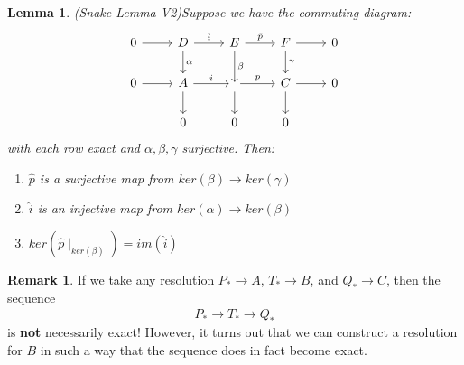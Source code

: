 \documentclass[12pt]{book}
\newtheorem{lemma}[theorem]{Lemma}
\theoremstyle{definition}
\newtheorem{remark}[theorem]{Remark}
\begin{document}
\begin{lemma}(Snake Lemma V2)\label{SnakeLemma}
    Suppose we have the commuting diagram: 
    \[
    \begin{tikzcd}
        0 \arrow[r] & D \arrow[d, "\alpha"] \arrow[r, "\hat{i}"] & E \arrow[r, "\hat{p}"] \arrow[d, "\beta"] & F \arrow[d, "\gamma"] \arrow[r] & 0 \\
        0 \arrow[r] & A \arrow[d] \arrow[r, "i"] & \arrow[d] \arrow[r, "p"] & C \arrow[r] \arrow[d]& 0 \\
        & 0 & 0 & 0 &
    \end{tikzcd}
    \]
    with each row exact and $\alpha, \beta, \gamma$ surjective. Then: 
    \begin{enumerate}
        \item $\hat{p}$ is a surjective map from $ker(\beta) \to ker(\gamma)$
        \item $\hat{i}$ is an injective map from $ker(\alpha) \to ker(\beta)$
        \item $ker(\hat{p} \mid_{ker(\beta)}) = im(\hat{i})$
    \end{enumerate}
\end{lemma}
\begin{remark}
    If we take any resolution $P_* \rightarrow A$, $T_* \rightarrow B$, and $Q_* \rightarrow C$, then the sequence
    \begin{align*}
        P_* \rightarrow T_* \rightarrow Q_*
    \end{align*}    
    is \textbf{not} necessarily exact! However, it turns out that we can construct a resolution for $B$ in such a way that the sequence does in fact become exact.
\end{remark}
\end{document}

